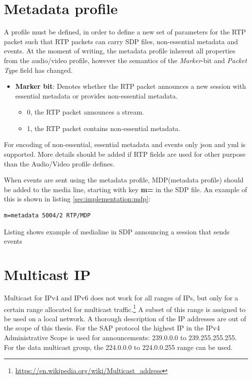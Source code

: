 \section{Metadata profile} \label{sec:implementation:metadataprofile} 
A profile must be defined, in order to define a new set of parameters for the RTP packet such that RTP packets can carry SDP files, non-essential metadata and events. At the moment of writing, the metadata profile inherent all properties from the audio/video profile, however the semantics of the  \textit{Marker}-bit and \textit{Packet Type} field has changed.

\begin{itemize}
	\item \textbf{Marker bit}: Denotes whether the RTP packet announces a new session with essential metadata or provides non-essential metadata.
		\begin{itemize}
			\item 0, the RTP packet announces a stream. 
			\item 1, the RTP packet contains non-essential metadata.
		\end{itemize}
\end{itemize}


For encoding of non-essential, essential metadata and events only json and yml is supported.
More details should be added if RTP fields are used for other purpose than the Audio/Video profile defines.

When events are sent using the metadata profile, MDP(metadata profile) should be added to the media line, starting with key \textbf{m=} in the SDP file. An example of this is shown in listing \ref{sec:implementation:mdp}:

\begin{listing}[h] 
\begin{verbatim}
m=metadata 5004/2 RTP/MDP
\end{verbatim}
\caption{Listing shows example of medialine in SDP announcing a session that sends events}
\label{cmd:implementation:mdp}
\end{listing}

\section{Multicast IP} \label{sec:implementation:multicastip}
Multicast for IPv4 and IPv6 does not work for all ranges of IPs, but only for a certain range allocated for multicast traffic.\footnote{\url{https://en.wikipedia.org/wiki/Multicast\_address}} 
A subset of this range is assigned to be used on a local network. 
A thorough description of the IP addresses are out of the scope of this thesis. 
For the SAP protocol\citep{RFC2974} the highest IP in the IPv4 Administrative Scope is used for announcements: 239.0.0.0 to 239.255.255.255. For the data multicast group, the 224.0.0.0 to 224.0.0.255 range can be used.

